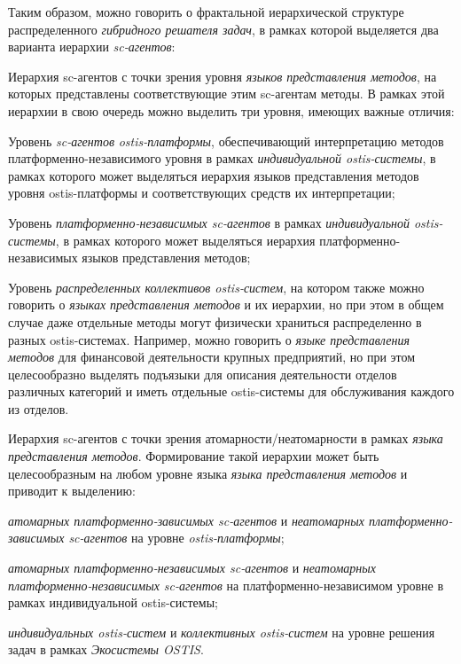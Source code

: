Таким образом, можно говорить о фрактальной иерархической структуре распределенного \textit{гибридного решателя задач}, в рамках которой выделяется два варианта иерархии \textit{sc-агентов}:
\begin{textitemize}
	\item Иерархия sc-агентов с точки зрения уровня \textit{языков представления методов}, на которых представлены соответствующие этим sc-агентам методы. В рамках этой иерархии в свою очередь можно выделить три уровня, имеющих важные отличия:
	\begin{textitemize}
		\item Уровень \textit{sc-агентов} \textit{ostis-платформы}, обеспечивающий интерпретацию методов платформенно-независимого уровня в рамках \textit{индивидуальной ostis-системы}, в рамках которого может выделяться иерархия языков представления методов уровня ostis-платформы и соответствующих средств их интерпретации;
		\item Уровень \textit{платформенно-независимых sc-агентов} в рамках \textit{индивидуальной ostis-системы}, в рамках которого может выделяться иерархия платформенно-независимых языков представления методов;
		\item Уровень \textit{распределенных коллективов ostis-систем}, на котором также можно говорить о \textit{языках представления методов} и их иерархии, но при этом в общем случае даже отдельные методы могут физически храниться распределенно в разных ostis-системах. Например, можно говорить о \textit{языке представления методов} для финансовой деятельности крупных предприятий, но при этом целесообразно выделять подъязыки для описания деятельности отделов различных категорий и иметь отдельные ostis-системы для обслуживания каждого из отделов.
	\end{textitemize}	
	\item Иерархия sc-агентов с точки зрения атомарности/неатомарности в рамках  \textit{языка представления методов}. Формирование такой иерархии может быть целесообразным на любом уровне языка \textit{языка представления методов} и приводит к выделению:
	\begin{textitemize}
		\item \textit{атомарных платформенно-зависимых sc-агентов} и \textit{неатомарных платформенно-зависимых sc-агентов} на уровне \textit{ostis-платформы};
		\item \textit{атомарных платформенно-независимых sc-агентов} и \textit{неатомарных платформенно-независимых sc-агентов} на платформенно-независимом уровне в рамках индивидуальной ostis-системы;
		\item \textit{индивидуальных ostis-систем} и \textit{коллективных ostis-систем} на уровне решения задач в рамках \textit{Экосистемы OSTIS}.
	\end{textitemize}	
\end{textitemize}
	

